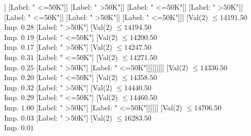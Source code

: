 \documentclass[margin=10pt]{standalone}
\begin{document}
\begin{forest}
																												[Val($2$) $ \leq 13960.50$ \\ Imp. $0.09$
																													[Val($2$) $ \leq 13924.50$ \\ Imp. $0.10$
																														[Val($2$) $ \leq 13917.50$ \\ Imp. $0.11$
																															[Val($2$) $ \leq 13871.50$ \\ Imp. $0.13$
																																[Val($2$) $ \leq 13826.50$ \\ Imp. $0.32$
																																	[Label: " <=50K"]
																																	[Label: " >50K"]]
																																[Label: " <=50K"]]
																															[Label: " >50K"]]
																														[Label: " <=50K"]]
																													[Label: " >50K"]]
																												[Label: " <=50K"]]
																											[Label: " >50K"]]
																										[Label: " <=50K"]]]
																								[Val($2$) $ \leq 14191.50$ \\ Imp. $0.28$
																									[Label: " >50K"]
																									[Val($2$) $ \leq 14194.50$ \\ Imp. $0.19$
																										[Label: " <=50K"]
																										[Val($2$) $ \leq 14200.50$ \\ Imp. $0.17$
																											[Label: " >50K"]
																											[Val($2$) $ \leq 14247.50$ \\ Imp. $0.31$
																												[Label: " <=50K"]
																												[Val($2$) $ \leq 14271.50$ \\ Imp. $0.25$
																													[Label: " >50K"]
																													[Label: " <=50K"]]]]]]]]]
																					[Val($2$) $ \leq 14336.50$ \\ Imp. $0.20$
																						[Label: " <=50K"]
																						[Val($2$) $ \leq 14358.50$ \\ Imp. $0.32$
																							[Label: " >50K"]
																							[Val($2$) $ \leq 14440.50$ \\ Imp. $0.29$
																								[Label: " <=50K"]
																								[Val($2$) $ \leq 14460.50$ \\ Imp. $1.00$
																									[Label: " >50K"]
																									[Label: " <=50K"]]]]]]
																				[Val($2$) $ \leq 14706.50$ \\ Imp. $0.03$
																					[Label: " >50K"]
																					[Val($2$) $ \leq 16283.50$ \\ Imp. $0.01$

\end{forest}
\end{document}
